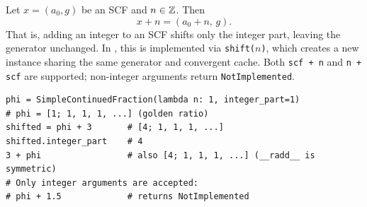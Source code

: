 \begin{proposition}
  Let $x = (a_0, g)$ be an SCF and $n \in \mathbb{Z}$.  Then
  \[
    x + n = (a_0 + n,\, g).
  \]
  That is, adding an integer to an SCF shifts only the integer part,
  leaving the generator unchanged.  In \catena, this is implemented via
  \texttt{shift($n$)}, which creates a new instance sharing the same
  generator and convergent cache.  Both \texttt{scf + n} and
  \texttt{n + scf} are supported; non-integer arguments return
  \texttt{NotImplemented}.
\end{proposition}

\begin{catenadef}
\begin{lstlisting}[style=python]
phi = SimpleContinuedFraction(lambda n: 1, integer_part=1)
# phi = [1; 1, 1, 1, ...] (golden ratio)
shifted = phi + 3       # [4; 1, 1, 1, ...]
shifted.integer_part    # 4
3 + phi                 # also [4; 1, 1, 1, ...] (__radd__ is symmetric)
# Only integer arguments are accepted:
# phi + 1.5             # returns NotImplemented
\end{lstlisting}
\end{catenadef}